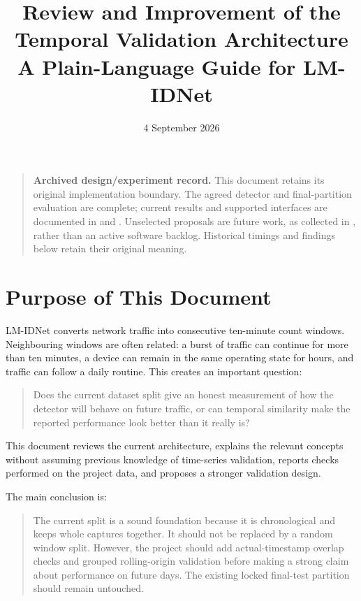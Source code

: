 \documentclass[11pt,a4paper]{article}
\title{Review and Improvement of the Temporal Validation Architecture\\[0.4em]
\large A Plain-Language Guide for LM-IDNet}
\author{}
\date{4 September 2026}
\begin{document}
\maketitle

\begin{quote}
\textbf{Archived design/experiment record.} This document retains its original
implementation boundary. The agreed detector and final-partition evaluation
are complete; current results and supported interfaces are documented in
 and
. Unselected proposals are future
work, as collected in , rather than an active software
backlog. Historical timings and findings below retain their original meaning.
\end{quote}

\tableofcontents
\newpage

\section{Purpose of This Document}

LM-IDNet converts network traffic into consecutive ten-minute count windows.
Neighbouring windows are often related: a burst of traffic can continue for
more than ten minutes, a device can remain in the same operating state for
hours, and traffic can follow a daily routine. This creates an important
question:

\begin{quote}
Does the current dataset split give an honest measurement of how the detector
will behave on future traffic, or can temporal similarity make the reported
performance look better than it really is?
\end{quote}

This document reviews the current architecture, explains the relevant concepts
without assuming previous knowledge of time-series validation, reports checks
performed on the project data, and proposes a stronger validation design.

The main conclusion is:

\begin{quote}
The current split is a sound foundation because it is chronological and keeps
whole captures together. It should not be replaced by a random window split.
However, the project should add actual-timestamp overlap checks and grouped
rolling-origin validation before making a strong claim about performance on
future days. The existing locked final-test partition should remain untouched.
\end{quote}
\end{document}
